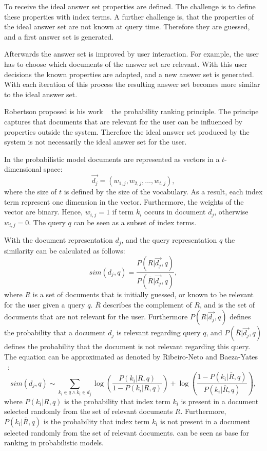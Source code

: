 To receive the ideal answer set properties are defined. The challenge is to define these properties with index terms. A further challenge is, that the properties of the ideal answer set are not known at query time. Therefore they are guessed, and a first answer set is generated.

Afterwards the answer set is improved by user interaction. For example, the user has to choose which documents of the answer set are relevant. With this user decisions the known properties are adapted, and a new answer set is generated. With each iteration of this process the resulting answer set becomes more similar to the ideal answer set. 

Robertson proposed is his work ~\cite{robertson-the-1997} the probability ranking principle. The principe captures that documents that are relevant for the user can be influenced by properties outside the system. Therefore the ideal answer set produced by the system is not necessarily the ideal answer set for the user.

In the probabilistic model documents are represented as vectors in a $t$-dimensional space:
\begin{equation}
  \vec{d_j} = (w_{1, j}, w_{2, j}, \dots, w_{t, j}),
\end{equation}
where the size of $t$ is defined by the size of the vocabulary. As a result, each index term represent one dimension in the vector. Furthermore, the weights of the vector are binary. Hence, $w_{i, j} = 1$ if term $k_i$ occurs in document $d_j$, otherwise $w_{i, j} = 0$. The query $q$ can be seen as a subset of index terms.

With the document representation $d_j$, and the query representation $q$ the similarity can be calculated as follows:
\begin{equation}
  sim(d_{j}, q) = \frac{P(R|\vec{d_j}, q)}{P(\overline{R}|\vec{d_j}, q)},
\end{equation}
where $R$ is a set of documents that is initially guessed, or known to be relevant for the user given a query $q$. $\overline{R}$ describes the complement of $R$, and is the set of documents that are not relevant for the user. Furthermore $P(R|\vec{d_j}, q)$ defines the probability that a document $d_j$ is relevant regarding query $q$, and $P(\overline{R}|\vec{d_j}, q)$ defines the probability that the document is not relevant regarding this query. The equation can be approximated as denoted by Ribeiro-Neto and Baeza-Yates ~\cite{ModernInvormationRetrieval1999}:
\begin{equation}
  \label{similarity_porbabilistic_approx}
  sim(d_{j}, q) \sim \sum_{k_i \in q \wedge k_i \in d_j} \log \left(\frac{P(k_i|R, q)}{1 - P(k_i|R, q)}\right) + \log \left(\frac{1 - P(k_i|\overline{R}, q)}{P(k_i|\overline{R}, q)}\right),
\end{equation}
where $P(k_i|R, q)$ is the probability that index term $k_i$ is present in a document selected randomly from the set of relevant documents $R$. Furthermore, $P(k_i|\overline{R}, q)$ is the probability that index term $k_i$ is not present in a document selected randomly from the set of relevant documents.  can be seen as base for ranking in probabilistic models.

